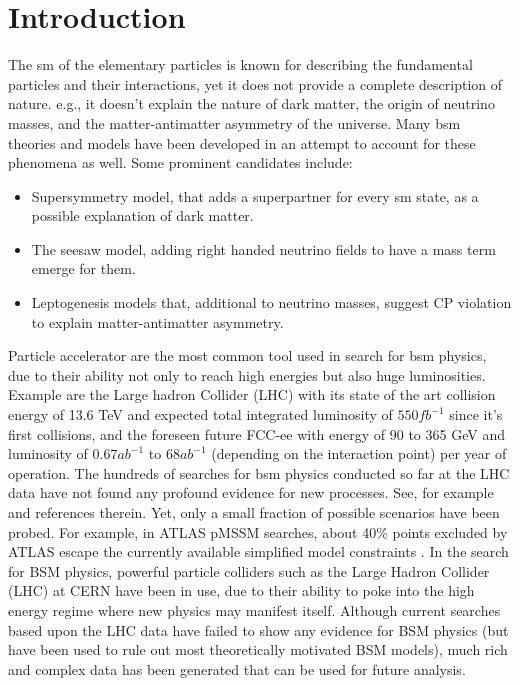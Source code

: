\documentclass[../ddppaper2.tex]{subfiles}
\begin{document}
\section{Introduction}

The \gls{sm} of the elementary particles \cite{Grossman_StandardModel_2023} is known for describing the fundamental particles and their interactions, yet it does not provide a complete description of nature. e.g., it doesn't explain the nature of dark matter, the origin of neutrino masses, and the matter-antimatter asymmetry of the universe. Many \gls{bsm} theories and models have been developed in an attempt to account for these phenomena as well. Some prominent candidates include:

\begin{itemize}
    \item Supersymmetry model, that adds a superpartner for every \gls{sm} state, as a possible explanation of dark matter.
    \item The seesaw model, adding right handed neutrino fields to have a mass term emerge for them.
    \item Leptogenesis models that, additional to neutrino masses, suggest CP violation to explain matter-antimatter asymmetry.
\end{itemize}

Particle accelerator are the most common tool used in search for \gls{bsm} physics, due to their ability not only to reach high energies but also huge luminosities. Example are the Large hadron Collider (LHC) \cite{CERN_Courier_LHC_Run3} with its state of the art collision energy of 13.6 TeV and expected total integrated luminosity of $550fb^{-1}$ since it's first collisions, and the foreseen future FCC-ee \cite{Benedikt_2026_FCC} with energy of 90 to 365 GeV and luminosity of $0.67ab^{-1}$ to $68ab^{-1}$ (depending on the interaction point) per year of operation. The hundreds of searches for \gls{bsm} physics conducted so far at the LHC data have not found any profound evidence for new processes. See, for example \cite{PDG_2024} and references therein. Yet, only a small fraction of possible scenarios have been probed. For example, in ATLAS pMSSM searches, about 40\% points excluded by ATLAS escape the currently available simplified model constraints \cite{Ambrogi_2018_pMSSM_misses}. In the search for BSM physics, powerful particle colliders such as the Large Hadron Collider (LHC) at CERN have been in use, due to their ability to poke into the high energy regime where new physics may manifest itself. Although current searches based upon the LHC data have failed to show any evidence for BSM physics (but have been used to rule out most theoretically motivated BSM models), much rich and complex data has been generated that can be used for future analysis. 
\end{document}
